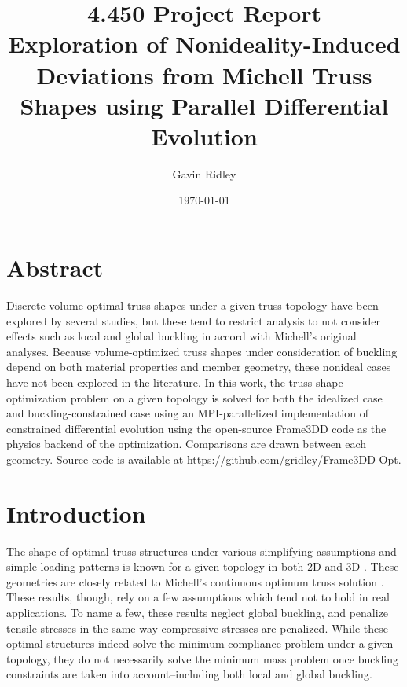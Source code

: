 \documentclass{report}
\author{Gavin Ridley}
\date{\today}
\title{4.450 Project Report\\ Exploration of Nonideality-Induced Deviations from Michell Truss Shapes using Parallel Differential Evolution}
\begin{document}
\section{Abstract}
Discrete volume-optimal truss shapes under a given truss topology have been explored by
several studies, but these tend to restrict analysis to not consider effects such
as local and global buckling in accord with Michell's original analyses.
Because volume-optimized truss shapes under consideration of
buckling depend on both material properties and member geometry, these nonideal cases have
not been explored in the literature. In this work, the truss shape optimization
problem on a given topology is solved for both the idealized case and buckling-constrained case
using an MPI-parallelized implementation of constrained differential evolution using
the open-source Frame3DD code as the physics backend of the optimization. Comparisons
are drawn between each geometry. Source code is available at \url{https://github.com/gridley/Frame3DD-Opt}.

\section{Introduction}

The shape of optimal truss structures under various simplifying assumptions and simple loading patterns
is known for a given topology in both 2D \cite{pragerNoteDiscretizedMichell1974,mazurekGeometricalAspectsOptimum2011} and 3D \cite{jacotStrainTensorMethod2016}.
These geometries are closely related to Michell's continuous optimum truss solution \cite{michellLimitsEconomyMaterial1904}.
These results, though, rely on a few assumptions
which tend not to hold in real applications. To name a few, these results neglect global
buckling, and penalize tensile stresses in the same way compressive stresses are penalized.
While these optimal structures indeed solve the minimum compliance problem under a given
topology, they do not necessarily solve the minimum mass problem once buckling constraints
are taken into account--including both local and global buckling.
\end{document}
